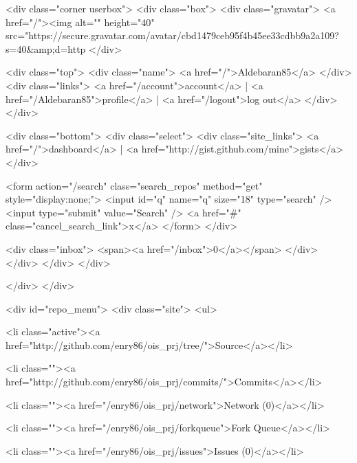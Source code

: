           
            
  <div class="corner userbox">
    <div class="box">
      <div class="gravatar">
        <a href="/"><img alt="" height="40" src="https://secure.gravatar.com/avatar/cbd1479ceb95f4b45ee33cdbb9a2a109?s=40&amp;d=http%
      </div>

      <div class="top">
        <div class="name">
          <a href="/">Aldebaran85</a>
        </div>
        <div class="links">
          <a href="/account">account</a> |
          <a href="/Aldebaran85">profile</a> |
          <a href="/logout">log out</a>
        </div>
      </div>

      <div class="bottom">
        <div class="select">
          <div class="site_links">
                        <a href="/">dashboard</a> | <a href="http://gist.github.com/mine">gists</a>
          </div>

          <form action="/search" class="search_repos" method="get" style="display:none;">
          <input id="q" name="q" size="18" type="search" /> 
          <input type="submit" value="Search" />
          <a href="#" class="cancel_search_link">x</a>
          </form>
        </div>
        
        <div class="inbox"> <span><a href="/inbox">0</a></span> </div>
      </div>
    </div>
  </div>

          
        </div>
      </div>
      
      
        
    <div id="repo_menu">
      <div class="site">
        <ul>
          
            <li class="active"><a href="http://github.com/enry86/ois_prj/tree/">Source</a></li>

            <li class=""><a href="http://github.com/enry86/ois_prj/commits/">Commits</a></li>

            
            <li class=""><a href="/enry86/ois_prj/network">Network (0)</a></li>

            
              <li class=""><a href="/enry86/ois_prj/forkqueue">Fork Queue</a></li>
            

            
            
              
              <li class=""><a href="/enry86/ois_prj/issues">Issues (0)</a></li>
            
            

            
              
